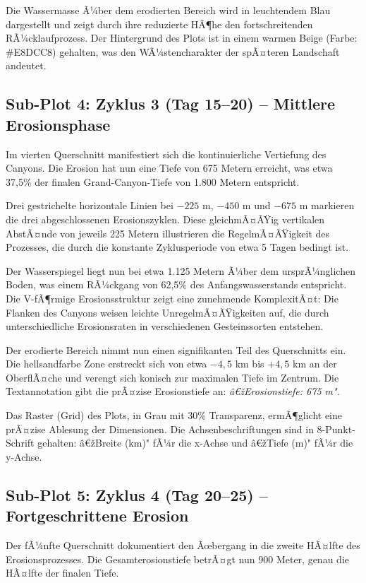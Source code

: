 ﻿\documentclass[12pt,a4paper]{report}
\begin{document}
Die Wassermasse Ã¼ber dem erodierten Bereich wird in leuchtendem Blau dargestellt und zeigt durch ihre reduzierte HÃ¶he den fortschreitenden RÃ¼cklaufprozess. Der Hintergrund des Plots ist in einem warmen Beige (Farbe: \#E8DCC8) gehalten, was den WÃ¼stencharakter der spÃ¤teren Landschaft andeutet.

\subsection{Sub-Plot 4: Zyklus 3 (Tag 15--20) -- Mittlere Erosionsphase}

Im vierten Querschnitt manifestiert sich die kontinuierliche Vertiefung des Canyons. Die Erosion hat nun eine Tiefe von 675 Metern erreicht, was etwa 37,5\% der finalen Grand-Canyon-Tiefe von 1.800 Metern entspricht.

Drei gestrichelte horizontale Linien bei $-225$ m, $-450$ m und $-675$ m markieren die drei abgeschlossenen Erosionszyklen. Diese gleichmÃ¤ÃŸig vertikalen AbstÃ¤nde von jeweils 225 Metern illustrieren die RegelmÃ¤ÃŸigkeit des Prozesses, die durch die konstante Zyklusperiode von etwa 5 Tagen bedingt ist.

Der Wasserspiegel liegt nun bei etwa 1.125 Metern Ã¼ber dem ursprÃ¼nglichen Boden, was einem RÃ¼ckgang von 62,5\% des Anfangswasserstands entspricht. Die V-fÃ¶rmige Erosionsstruktur zeigt eine zunehmende KomplexitÃ¤t: Die Flanken des Canyons weisen leichte UnregelmÃ¤ÃŸigkeiten auf, die durch unterschiedliche Erosionsraten in verschiedenen Gesteinssorten entstehen.

Der erodierte Bereich nimmt nun einen signifikanten Teil des Querschnitts ein. Die hellsandfarbe Zone erstreckt sich von etwa $-4,5$ km bis $+4,5$ km an der OberflÃ¤che und verengt sich konisch zur maximalen Tiefe im Zentrum. Die Textannotation gibt die prÃ¤zise Erosionstiefe an: \textit{â€žErosionstiefe: 675 m"}.

Das Raster (Grid) des Plots, in Grau mit 30\% Transparenz, ermÃ¶glicht eine prÃ¤zise Ablesung der Dimensionen. Die Achsenbeschriftungen sind in 8-Punkt-Schrift gehalten: â€žBreite (km)" fÃ¼r die x-Achse und â€žTiefe (m)" fÃ¼r die y-Achse.

\subsection{Sub-Plot 5: Zyklus 4 (Tag 20--25) -- Fortgeschrittene Erosion}

Der fÃ¼nfte Querschnitt dokumentiert den Ãœbergang in die zweite HÃ¤lfte des Erosionsprozesses. Die Gesamterosionstiefe betrÃ¤gt nun 900 Meter, genau die HÃ¤lfte der finalen Tiefe.
\end{document}
